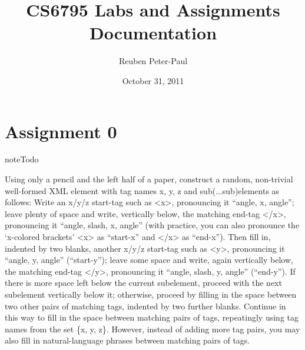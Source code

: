\documentclass[letterpaper,10pt,english]{sphinxmanual}
\title{CS6795 Labs and Assignments Documentation}
\date{October 31, 2011}
\author{Reuben Peter-Paul}
\begin{document}
\maketitle
\tableofcontents
{}\label{index::doc}



\chapter{Assignment 0}
\label{assign0:cs6795-labs-and-assignments}\label{assign0:assignment-0}\label{assign0::doc}
\begin{notice}{note}{Todo}

Using only a pencil and the left half of a paper, construct a random, non-trivial well-formed XML element with tag names x, y, z and sub(...sub)elements as follows: Write an x/y/z start-tag such as \textless{}x\textgreater{}, pronouncing it ``angle, x, angle''; leave plenty of space and write, vertically below, the matching end-tag \textless{}/x\textgreater{}, pronouncing it ``angle, slash, x, angle'' (with practice, you can also pronounce the `x-colored brackets' \textless{}x\textgreater{} as ``start-x'' and \textless{}/x\textgreater{} as ``end-x''). Then fill in, indented by two blanks, another x/y/z start-tag such as \textless{}y\textgreater{}, pronouncing it ``angle, y, angle'' (``start-y''); leave some space and write, again vertically below, the matching end-tag \textless{}/y\textgreater{}, pronouncing it ``angle, slash, y, angle'' (``end-y''). If there is more space left below the current subelement, proceed with the next subelement vertically below it; otherwise, proceed by filling in the space between two other pairs of matching tags, indented by two further blanks. Continue in this way to fill in the space between matching pairs of tags, repeatingly using tag names from the set \{x, y, z\}. However, instead of adding more tag pairs, you may also fill in natural-language phrases between matching pairs of tags.
\end{notice}
\end{document}
